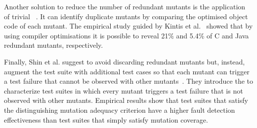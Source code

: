 
Another solution to reduce the number of redundant mutants is the application of trivial ~\cite{papadakis2015trivial, kintis2017detecting,papadakis2019mutation}. 
It can identify duplicate mutants by comparing the optimised object code of each mutant. The empirical study guided by Kintis et al.~\cite{kintis2017detecting} showed that by using compiler optimisations it is possible to reveal 21\% and 5.4\% of C and Java redundant mutants, respectively.


Finally, Shin et al. suggest to avoid discarding redundant mutants but, instead, augment the test suite with additional test cases so that 
each mutant can trigger a test failure that cannot be observed with other mutants~\cite{Shin:TSE:DCriterion:2018}. 
They introduce the  to characterize test suites in which every mutant triggers a test failure that is not observed with other mutants.
Empirical results show that test suites that satisfy the distinguishing mutation adequacy criterion have a higher
 fault detection effectiveness than test suites that simply satisfy mutation coverage.



